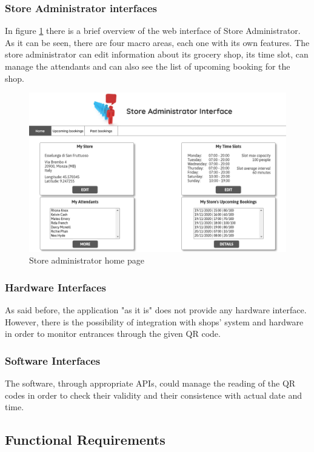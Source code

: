 \documentclass[table, 12pt]{article}
\begin{document}
\begin{flushleft}
    \subsubsection{Store Administrator interfaces}
    In figure \ref{mock_store_admin_home} there is a brief overview of the web interface of Store Administrator.
    As it can be seen, there are four macro areas, each one with its own features.
    The store administrator can edit information about its grocery shop, its time slot, can manage the attendants and can also see the list of upcoming booking for the shop.
    \begin{figure}[H]
        \includegraphics[width=\textwidth]{assets/mock_home_store_admin.png}
        \caption{Store administrator home page}
        \label{mock_store_admin_home}
    \end{figure}

    \subsubsection{Hardware Interfaces}
    As said before, the application "as it is" does not provide any hardware interface.
    However, there is the possibility of integration with shops' system and hardware in order to monitor entrances through the given QR code.
    \subsubsection{Software Interfaces}
    The software, through appropriate APIs, could manage the reading of the QR codes in order to check their validity and their consistence with actual date and time.


    \subsection{Functional Requirements}

\end{flushleft}
\end{document}
